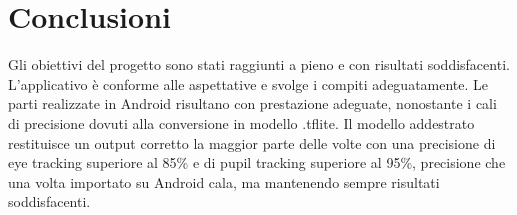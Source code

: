\documentclass[11pt]{article}
\begin{document}
\newpage
\section{Conclusioni}
\label{sec:con}
Gli obiettivi del progetto sono stati raggiunti a pieno e con risultati soddisfacenti. 
\newline \newline
L’applicativo è
conforme alle aspettative e svolge i compiti adeguatamente.
Le parti realizzate
in Android risultano con prestazione adeguate, nonostante i cali di precisione dovuti alla conversione in modello .tflite.
\newline \newline
Il modello addestrato restituisce un output corretto la maggior parte delle volte con una precisione di eye tracking superiore al 85\% e di pupil tracking superiore al 95\%, precisione che una volta importato su Android cala, ma mantenendo sempre risultati soddisfacenti.
\end{document}
